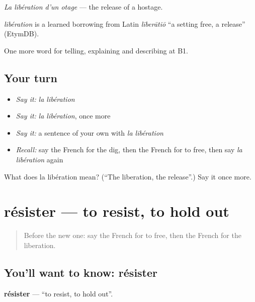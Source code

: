 \emph{La libération d'un otage} — the release of a hostage.

\begin{cousinweb}
\emph{libération} is a learned borrowing from Latin \emph{līberātiō} \textquotedblleft{}a setting free, a release\textquotedblright{} (EtymDB).
\end{cousinweb}

\begin{grammarlens}[title={What you've built}]
One more word for telling, explaining and describing at B1.
\end{grammarlens}

\subsection*{Your turn}
\begin{itemize}
\raggedright
  \item \emph{Say it:} \emph{la libération}
  \item \emph{Say it:} \emph{la libération}, once more
  \item \emph{Say it:} a sentence of your own with \emph{la libération}
  \item \emph{Recall:} say the French for the dig, then the French for to free, then say \emph{la libération} again
\end{itemize}

\begin{tcolorbox}[breakable,colback=teal!4,colframe=teal!35!black,title={Before you move on}]
What does la libération mean? (\textquotedblleft{}The liberation, the release\textquotedblright{}.) Say it once more.
\end{tcolorbox}
\section[résister]{résister — to resist, to hold out}

\label{lesson:FR-C326-resister}



\begin{quote}
Before the new one: say the French for to free, then the French for the liberation.
\end{quote}

\subsection*{You'll want to know: résister}
\textbf{résister} — \textquotedblleft{}to resist, to hold out\textquotedblright{}.

